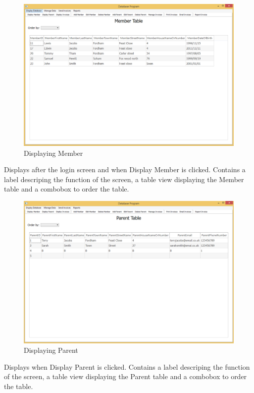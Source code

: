 \begin{figure}[H]
\includegraphics[width=\textwidth]{./Maintenance/Images/DisplayMember.png}
    \caption{Displaying Member} \label{fig:display_member}
\end{figure}

Displays after the login screen and when Display Member is clicked. Contains a label descriping the function of the screen, a table view displaying the Member table and a combobox to order the table.

\begin{figure}[H]
\includegraphics[width=\textwidth]{./Maintenance/Images/DisplayParent.png}
    \caption{Displaying Parent} \label{fig:display_parent}
\end{figure}

Displays when Display Parent is clicked. Contains a label descriping the function of the screen, a table view displaying the Parent table and a combobox to order the table.

